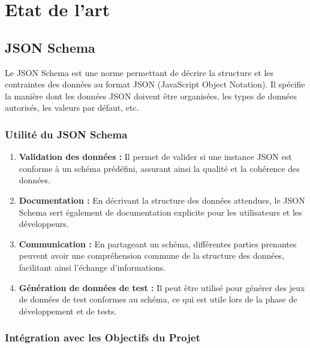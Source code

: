 \chapter{Etat de l'art}


    \section{JSON Schema}

        Le JSON Schema \cite{JSON_Schema} est une norme permettant de décrire la structure et les contraintes des données au format JSON (JavaScript Object Notation). Il spécifie la manière dont les données JSON doivent être organisées, les types de données autorisés, les valeurs par défaut, etc.

        \subsection{Utilité du JSON Schema}

            \begin{enumerate}
                \item \textbf{Validation des données :} Il permet de valider si une instance JSON est conforme à un schéma prédéfini, assurant ainsi la qualité et la cohérence des données.
                
                \item \textbf{Documentation :} En décrivant la structure des données attendues, le JSON Schema sert également de documentation explicite pour les utilisateurs et les développeurs.
                
                \item \textbf{Communication :} En partageant un schéma, différentes parties prenantes peuvent avoir une compréhension commune de la structure des données, facilitant ainsi l'échange d'informations.
                
                \item \textbf{Génération de données de test :} Il peut être utilisé pour générer des jeux de données de test conformes au schéma, ce qui est utile lors de la phase de développement et de tests.
            \end{enumerate}

        \subsection{Intégration avec les Objectifs du Projet}

